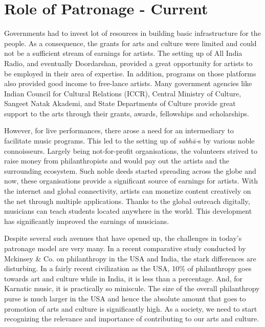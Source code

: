 \vspace{-.3cm}

\section*{Role of Patronage - Current}

\vspace{-.2cm}

Governments had to invest lot of resources in building basic infrastructure for the people. As a consequence, the grants for arts and culture were limited and could not be a sufficient stream of earnings for artists. The setting up of All India Radio, and eventually Doordarshan, provided a great opportunity for artists to be employed in their area of expertise. In addition, programs on those platforms also provided good income to free-lance artists. Many government agencies like Indian Council for Cultural Relations (ICCR), Central Ministry of Culture, Sangeet Natak Akademi, and State Departments of Culture provide great support to the arts through their grants, awards, fellowships and scholarships.

However, for live performances, there arose a need for an intermediary to facilitate music programs. This led to the setting up of \textit{sabhā-}s by various noble connoisseurs. Largely being not-for-profit organisations, the volunteers strived to raise money from philanthropists and would pay out the artists and the surrounding ecosystem. Such noble deeds started spreading across the globe and now, these organisations provide a significant source of earnings for artists. With the internet and global connectivity, artists can monetize content creatively on the net through multiple applications. Thanks to the global outreach digitally, musicians can teach students located anywhere in the world. This development has significantly improved the earnings of musicians.

Despite several such avenues that have opened up, the challenges in today’s patronage model are very many. In a recent comparative study conducted by Mckinsey \& Co. on philanthropy in the USA and India, the stark differences are disturbing. In a fairly recent civilization as the USA, 10\% of philanthropy goes towards art and culture while in India, it is less than a percentage. And, for Karnatic music, it is practically so miniscule. The size of the overall philanthropy purse is much larger in the USA and hence the absolute amount that goes to promotion of arts and culture is significantly high. As a society, we need to start recognizing the relevance and importance of contributing to our arts and culture.

